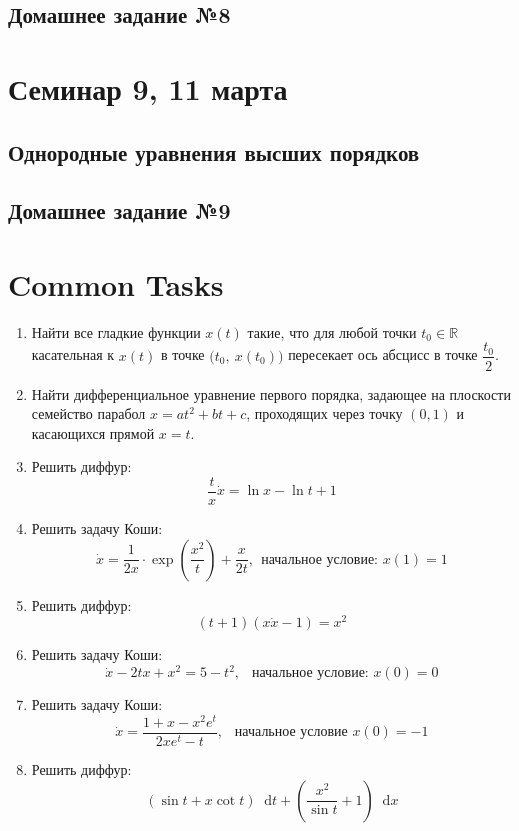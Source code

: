 \documentclass[a4paper,12pt]{article}
\newcommand{\R}{\mathbb{R}}
\renewcommand*\d{\mathop{}\!\mathrm{d}}
\newcommand{\dx}{\dot{x}}
\begin{document}
\subsection{Домашнее задание №8}


\newpage
\section{Семинар 9, 11 марта}

\subsection{Однородные уравнения высших порядков}

\subsection{Домашнее задание №9}


\newpage
\section{Common Tasks}

\begin{enumerate}
	\item Найти все гладкие функции $x(t)$ такие, что для любой точки $t_0 \in \R$ касательная к $x(t)$ в точке $\big(t_0,\ x(t_0)\big)$ пересекает ось абсцисс в точке $\dfrac{t_0}{2}$.
	\item Найти дифференциальное уравнение первого порядка, задающее на плоскости семейство парабол
	$x = at^2 + bt + c$, проходящих через 
	точку $(0,1)$ и касающихся прямой $x = t$. 
	\item Решить диффур: \[\dfrac{t}{x}\dx = \ln x - \ln t + 1\]
	\item Решить задачу Коши:
	\[	\dx = \dfrac{1}{2x}\cdot \exp(\frac{x^2}{t}) + \dfrac{x}{2t},\ \ 	\text{начальное условие: }x(1) = 1\]
	\item Решить диффур: \[(t + 1)(x\dx - 1) = x^2\]
	\item Решить задачу Коши: \[\dx - 2tx + x^2 = 5 - t^2,\ \ \text{ начальное условие: }x(0) = 0\]
	\item Решить задачу Коши:
	\[\dx = \dfrac{1 + x - x^2e^t}{2xe^t - t},\ \ \text{ начальное условие } x(0) = -1\]
	\item Решить диффур:
	\[(\sin t + x\cot t)\d t + \left(\dfrac{x^2}{\sin t} + 1\right)\d x\]
\end{enumerate}
\end{document}
